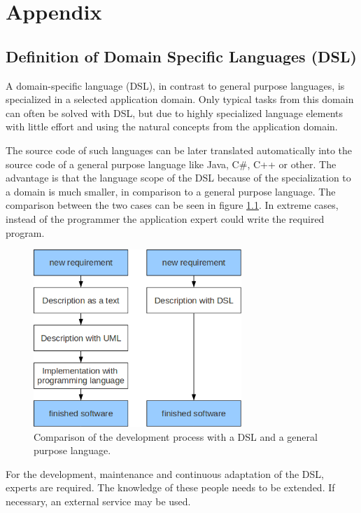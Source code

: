 \chapter{Appendix}
\section{Definition of Domain Specific Languages (DSL)}
\par
A domain-specific language (DSL), in contrast to general purpose languages, is specialized in a selected application domain. Only typical tasks from this domain can often be solved with DSL, but due to highly specialized language elements with little effort and using the natural concepts from the application domain.
\par
The source code of such languages can be later translated automatically into the source code of a general purpose language like Java, C\#, C++ or other. The advantage is that the language scope of the DSL because of the specialization to a domain is much smaller, in comparison to a general purpose language. The comparison between the two cases can be seen in figure \ref{fig:dsl}. In extreme cases, instead of the programmer the application expert could write the required program. \autocite{appendix:dsl}
\begin{figure}[h]
	\centering
	\includegraphics[width=0.7\textwidth]{pics/appendix/dsl.png}
	\caption{Comparison of the development process with a DSL and a general purpose language.  \label{fig:dsl}}	
\end{figure}
\par
For the development, maintenance and continuous adaptation of the DSL, experts are required. The knowledge of these people needs to be extended. If necessary, an external service may be used. \autocite{appendix:dsl} 


